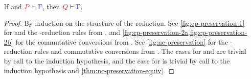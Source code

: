\begin{theorem}[Preservation]\label{thm:nc-preservation}
  If  and $\seq[{ P }]{ \Gamma }$, then $\seq[{ Q }]{ \Gamma }$.
\end{theorem}
\begin{proof}
  By induction on the structure of the reduction. See
  \cref{fig:cp-preservation-1} for  and the \textbeta-reduction
  rules from \cp, and \cref{fig:cp-preservation-2a,fig:cp-preservation-2b} for the
  commutative conversions from \cp.
  See \cref{fig:nc-preservation} for the \textbeta-reduction rules and
  commutative conversions from \nodcap.
  The cases for \cpRedGammaCut and \ncRedGammaPool are trivial by call to the
  induction hypothesis, and the case for \cpRedGammaEquiv is trivial by call to
  the induction hypothesis and \cref{thm:nc-preservation-equiv}.
\end{proof}
